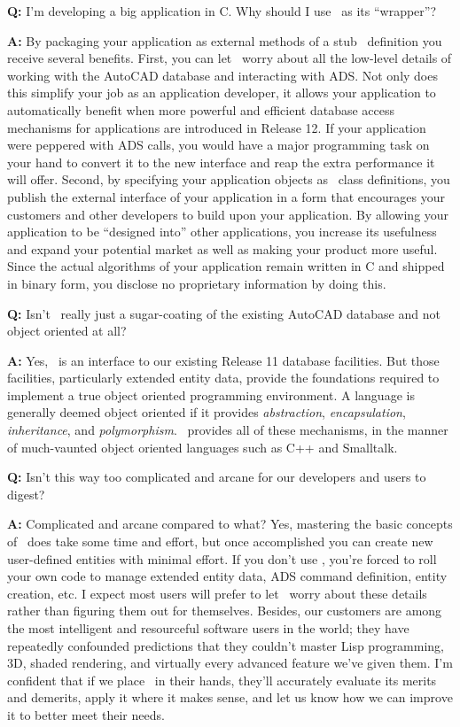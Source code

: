 \documentclass{article}
\begin{document}
{\bf Q:} I'm developing a big application in C\@.  Why should I use
\cw\ as its ``wrapper''?

{\bf A:} By packaging your application as external methods of a stub
\cw\ definition you receive several benefits.  First, you can let \cw\
worry about all the low-level details of working with the AutoCAD
database and interacting with ADS\@.  Not only does this simplify your
job as an application developer, it allows your application to
automatically benefit when more powerful and efficient database access
mechanisms for applications are introduced in Release 12.  If your
application were peppered with ADS calls, you would have a major
programming task on your hand to convert it to the new interface and
reap the extra performance it will offer.  Second, by specifying your
application objects as \cw\ class definitions, you publish the
external interface of your application in a form that encourages your
customers and other developers to build upon your application.  By
allowing your application to be ``designed into'' other applications,
you increase its usefulness and expand your potential market as well
as making your product more useful.  Since the actual algorithms of
your application remain written in C and shipped in binary form, you
disclose no proprietary information by doing this.

{\bf Q:}  Isn't \cw\ really just a sugar-coating of the existing
AutoCAD database and not object oriented at all?

{\bf A:}  Yes, \cw\ is an interface to our existing Release 11
database facilities.  But those facilities, particularly extended
entity data, provide the foundations required to implement a true
object oriented programming environment.  A language is generally
deemed object oriented if it provides {\em abstraction}, {\em
encapsulation}, {\em inheritance}, and {\em polymorphism}.  \cw\
provides all of these mechanisms, in the manner of much-vaunted object
oriented languages such as C++ and Smalltalk.

{\bf Q:}  Isn't this way too complicated and arcane for our developers and
users to digest?

{\bf A:}  Complicated and arcane compared to what?  Yes, mastering the
basic concepts of \cw\ does take some time and effort, but once
accomplished you can create new user-defined entities with minimal
effort.  If you don't use \cw , you're forced to roll your own code to
manage extended entity data, ADS command definition, entity creation,
etc.  I expect most users will prefer to let \cw\ worry about these
details rather than figuring them out for themselves.  Besides, our
customers are among the most intelligent and resourceful software
users in the world; they have repeatedly confounded predictions that
they couldn't master Lisp programming, 3D, shaded rendering, and
virtually every advanced feature we've given them.  I'm confident that
if we place \cw\ in their hands, they'll accurately evaluate its
merits and demerits, apply it where it makes sense, and let us know
how we can improve it to better meet their needs.
\end{document}
